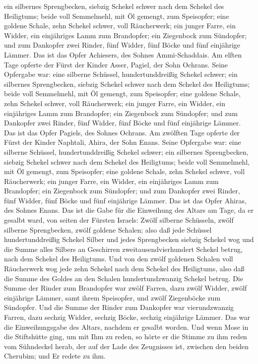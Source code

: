 ein silbernes Sprengbecken, siebzig Schekel schwer nach dem Schekel des
Heiligtums; beide voll Semmelmehl, mit Öl gemengt, zum Speisopfer;
 eine goldene Schale, zehn Schekel schwer, voll
Räucherwerk;  ein junger Farre, ein Widder, ein
einjähriges Lamm zum Brandopfer;  ein Ziegenbock zum
Sündopfer;  und zum Dankopfer zwei Rinder, fünf Widder,
fünf Böcke und fünf einjährige Lämmer. Das ist das Opfer Achiesers, des
Sohnes Ammi-Schaddais.  Am elften Tage opferte der Fürst
der Kinder Asser, Pagiel, der Sohn Ochrans.  Seine
Opfergabe war: eine silberne Schüssel, hundertunddreißig Schekel schwer;
ein silbernes Sprengbecken, siebzig Schekel schwer nach dem Schekel des
Heiligtums; beide voll Semmelmehl, mit Öl gemengt, zum Speisopfer;
 eine goldene Schale, zehn Schekel schwer, voll
Räucherwerk;  ein junger Farre, ein Widder, ein
einjähriges Lamm zum Brandopfer;  ein Ziegenbock zum
Sündopfer;  und zum Dankopfer zwei Rinder, fünf Widder,
fünf Böcke und fünf einjährige Lämmer. Das ist das Opfer Pagiels, des
Sohnes Ochrans.  Am zwölften Tage opferte der Fürst der
Kinder Naphtali, Ahira, der Sohn Enans.  Seine Opfergabe
war: eine silberne Schüssel, hundertunddreißig Schekel schwer; ein
silbernes Sprengbecken, siebzig Schekel schwer nach dem Schekel des
Heiligtums; beide voll Semmelmehl, mit Öl gemengt, zum Speisopfer;
 eine goldene Schale, zehn Schekel schwer, voll
Räucherwerk;  ein junger Farre, ein Widder, ein
einjähriges Lamm zum Brandopfer;  ein Ziegenbock zum
Sündopfer;  und zum Dankopfer zwei Rinder, fünf Widder,
fünf Böcke und fünf einjährige Lämmer. Das ist das Opfer Ahiras, des
Sohnes Enans.  Das ist die Gabe für die Einweihung des
Altars am Tage, da er gesalbt ward, von seiten der Fürsten Israels:
Zwölf silberne Schüsseln, zwölf silberne Sprengbecken, zwölf goldene
Schalen;  also daß jede Schüssel hundertunddreißig
Schekel Silber und jedes Sprengbecken siebzig Schekel wog und die Summe
alles Silbers an Geschirren zweitausendvierhundert Schekel betrug, nach
dem Schekel des Heiligtums.  Und von den zwölf goldenen
Schalen voll Räucherwerk wog jede zehn Schekel nach dem Schekel des
Heiligtums, also daß die Summe des Goldes an den Schalen
hundertundzwanzig Schekel betrug.  Die Summe der Rinder
zum Brandopfer war zwölf Farren, dazu zwölf Widder, zwölf einjährige
Lämmer, samt ihrem Speisopfer, und zwölf Ziegenböcke zum Sündopfer.
 Und die Summe der Rinder zum Dankopfer war
vierundzwanzig Farren, dazu sechzig Widder, sechzig Böcke, sechzig
einjährige Lämmer. Das war die Einweihungsgabe des Altars, nachdem er
gesalbt worden.  Und wenn Mose in die Stiftshütte ging,
um mit Ihm zu reden, so hörte er die Stimme zu ihm reden vom Sühndeckel
herab, der auf der Lade des Zeugnisses ist, zwischen den beiden
Cherubim; und Er redete zu ihm.

